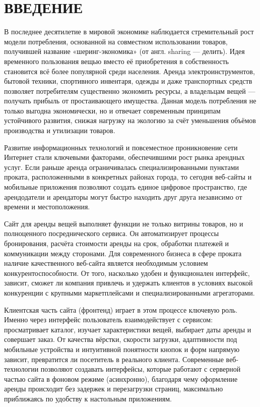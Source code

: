 \section*{ВВЕДЕНИЕ}

В последнее десятилетие в мировой экономике наблюдается стремительный рост модели потребления, основанной на совместном использовании товаров, получившей название «шеринг-экономика» (от англ. sharing — делить). Идея временного пользования вещью вместо её приобретения в собственность становится всё более популярной среди населения. Аренда электроинструментов, бытовой техники, спортивного инвентаря, одежды и даже транспортных средств позволяет потребителям существенно экономить ресурсы, а владельцам вещей — получать прибыль от простаивающего имущества. Данная модель потребления не только выгодна экономически, но и отвечает современным принципам устойчивого развития, снижая нагрузку на экологию за счёт уменьшения объёмов производства и утилизации товаров.

Развитие информационных технологий и повсеместное проникновение сети Интернет стали ключевыми факторами, обеспечившими рост рынка арендных услуг. Если раньше аренда ограничивалась специализированными пунктами проката, расположенными в конкретных районах города, то сегодня веб-сайты и мобильные приложения позволяют создать единое цифровое пространство, где арендодатели и арендаторы могут быстро находить друг друга независимо от времени и местоположения.

Сайт для аренды вещей выполняет функции не только витрины товаров, но и полноценного посреднического сервиса. Он автоматизирует процессы бронирования, расчёта стоимости аренды на срок, обработки платежей и коммуникации между сторонами. Для современного бизнеса в сфере проката наличие качественного веб-сайта является необходимым условием конкурентоспособности. От того, насколько удобен и функционален интерфейс, зависит, сможет ли компания привлечь и удержать клиентов в условиях высокой конкуренции с крупными маркетплейсами и специализированными агрегаторами.

Клиентская часть сайта (фронтенд) играет в этом процессе ключевую роль. Именно через интерфейс пользователь взаимодействует с сервисом: просматривает каталог, изучает характеристики вещей, выбирает даты аренды и совершает заказ. От качества вёрстки, скорости загрузки, адаптивности под мобильные устройства и интуитивной понятности кнопок и форм напрямую зависит, превратится ли посетитель в реального клиента. Современные веб-технологии позволяют создавать интерфейсы, которые работают с серверной частью сайта в фоновом режиме (асинхронно), благодаря чему оформление аренды происходит без задержек и перезагрузки страниц, максимально приближаясь по удобству к настольным приложениям.

